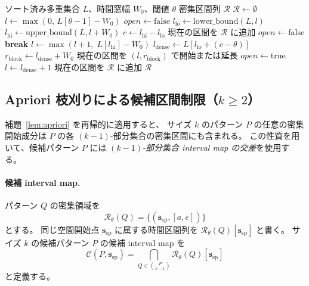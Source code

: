 \begin{algorithm}[t]
\caption{固定空間開始点に対する重複考慮密集区間計算}
\label{alg:t_stride}
\begin{algorithmic}[1]
\Require ソート済み多重集合 $L$、時間窓幅 $W_0$、閾値 $\theta$
\Ensure 密集区間列 $\mathcal{R}$
\State $\mathcal{R} \leftarrow \emptyset$
\State $l \leftarrow \max(0,\, L[\theta-1] - W_0)$
\State $\mathit{open} \leftarrow \mathrm{false}$
  \State $l_{\mathrm{lo}} \leftarrow \mathrm{lower\_bound}(L, l)$
  \State $l_{\mathrm{hi}} \leftarrow \mathrm{upper\_bound}(L, l + W_0)$
  \State $c \leftarrow l_{\mathrm{hi}} - l_{\mathrm{lo}}$
      \State 現在の区間を $\mathcal{R}$ に追加
      \State $\mathit{open} \leftarrow \mathrm{false}$
    \EndIf
     \textbf{break} \EndIf
    \State $l \leftarrow \max(l+1,\; L[l_{\mathrm{hi}}] - W_0)$
  \Else
    \State $l_{\mathrm{dense}} \leftarrow L[l_{\mathrm{lo}} + (c-\theta)]$
    \State $r_{\mathrm{block}} \leftarrow l_{\mathrm{dense}} + W_0$
    \State 現在の区間を $(l, r_{\mathrm{block}})$ で開始または延長
    \State $\mathit{open} \leftarrow \mathrm{true}$
    \State $l \leftarrow l_{\mathrm{dense}} + 1$
  \EndIf
\EndWhile
{}
  \State 現在の区間を $\mathcal{R}$ に追加
\EndIf
\State \Return $\mathcal{R}$
\end{algorithmic}
\end{algorithm}

\subsection{Apriori 枝刈りによる候補区間制限（$k \geq 2$）}\label{sec:alg_k2}

補題~\ref{lem:apriori} を再帰的に適用すると、
サイズ $k$ のパターン $P$ の任意の密集開始成分は
$P$ の各 $(k{-}1)$-部分集合の密集区間にも含まれる。
この性質を用いて、候補パターン $P$ には
\emph{$(k{-}1)$-部分集合 interval map の交差}を使用する。

\paragraph{候補 interval map.}
パターン $Q$ の密集領域を
\[
  \mathcal{R}_\theta(Q)
  = \{(\bm{s}_{\mathrm{sp}}, [a,e])\}
\]
とする。
同じ空間開始点 $\bm{s}_{\mathrm{sp}}$ に属する時間区間列を
$\mathcal{R}_\theta(Q)[\bm{s}_{\mathrm{sp}}]$ と書く。
サイズ $k$ の候補パターン $P$ の候補 interval map を
\begin{equation}\label{eq:candidate_cells}
  \mathcal{C}(P,\bm{s}_{\mathrm{sp}})
  =
  \bigcap_{Q \in \binom{P}{k-1}}
  \mathcal{R}_\theta(Q)[\bm{s}_{\mathrm{sp}}]
\end{equation}
と定義する。

